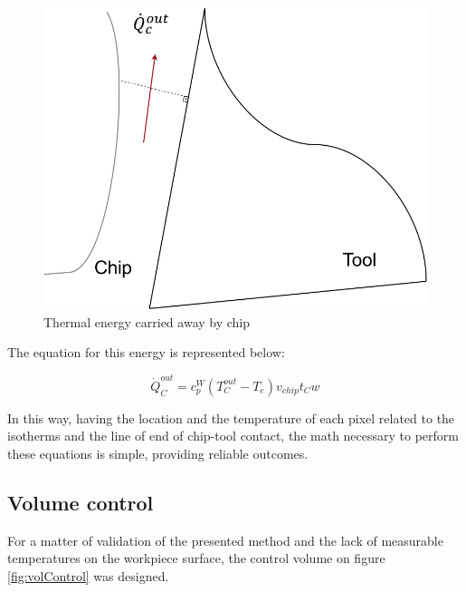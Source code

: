 			\begin{figure}[H]
				\centering
				\captionsetup{justification=centering}
				\includegraphics[scale=0.6]{Cap4/energyChip.png}
				\caption{Thermal energy carried away by chip}
				\label{fig:energychip}
			\end{figure}

			The equation for this energy is represented below:

			\begin{equation} 
			\label{eq_energychip}
				\dot{Q}_{C}^{out} = c_{p}^{W}(T_{C}^{out} - T_{e})v_{chip}t_{C}w
			\end{equation}

		In this way, having the location and the temperature of each pixel related to the isotherms and the line of end of chip-tool contact, the math necessary to perform these equations is simple, providing reliable outcomes.

	\subsection{Volume control}

		For a matter of validation of the presented method and the lack of measurable temperatures on the workpiece surface, the control volume on figure \ref{fig:volControl} was designed.

